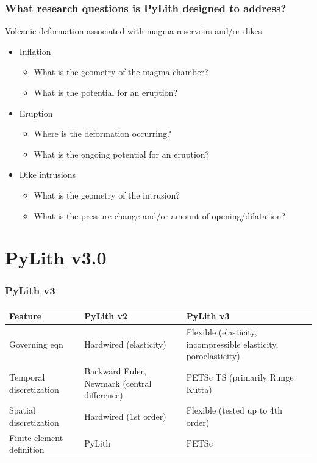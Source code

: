 \documentclass[aspectratio=169]{beamer}
\begin{document}
\begin{frame}
  \frametitle{What research questions is PyLith designed to address?}

  \vfill
  Volcanic deformation associated with magma reservoirs and/or dikes
  \begin{itemize}
  \item Inflation
    \begin{itemize}
    \item What is the geometry of the magma chamber?
    \item What is the potential for an eruption?
    \end{itemize}
  \item Eruption
    \begin{itemize}
    \item Where is the deformation occurring?
    \item What is the ongoing potential for an eruption?
    \end{itemize}
  \item Dike intrusions
    \begin{itemize}
    \item What is the geometry of the intrusion?
    \item What is the pressure change and/or amount of opening/dilatation?
    \end{itemize}
  \end{itemize}
  \vfill

\end{frame}


\section{PyLith v3.0}

\begin{frame}
  \frametitle{PyLith v3}

  \footnotesize{\begin{tabular}{p{3.0cm}p{5.0cm}p{5.0cm}}
    \toprule
    Feature
    & PyLith v2
    & PyLith v3 \\
    \midrule
    Governing eqn
    & Hardwired (elasticity)
    & Flexible (elasticity, incompressible elasticity, poroelasticity)
    \\[2em]
    Temporal discretization
    & Backward Euler, Newmark (central difference)
    & PETSc TS (primarily Runge Kutta)
      \\[2em]
    Spatial discretization
    & Hardwired (1st order)
    & Flexible (tested up to 4th order)
           \\[1em]
           Finite-element definition
           & PyLith
           & PETSc \\
    \bottomrule
  \end{tabular}}
    
\end{frame}
\end{document}
